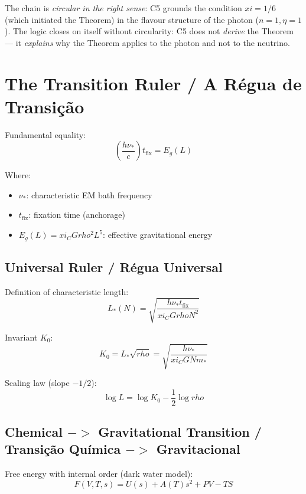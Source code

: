 \documentclass[12pt,a4paper]{article}
\def\to{ -> }%
\def\xi{xi}%
\def\rho{rho}%
\begin{document}
The chain is \emph{circular in the right sense}: C5 grounds the condition $\xi = 1/6$ (which initiated the Theorem) in the flavour structure of the photon ($n=1, \eta=1$). The logic closes on itself without circularity: C5 does not \emph{derive} the Theorem --- it \emph{explains} why the Theorem applies to the photon and not to the neutrino.

\section{The Transition Ruler / A Régua de Transição}

Fundamental equality:
\begin{equation}
\left(\frac{h\nu_*}{c}\right)t_{\text{fix}} = E_g(L)
\end{equation}

Where:
\begin{itemize}
    \item $\nu_*$: characteristic EM bath frequency
    \item $t_{\text{fix}}$: fixation time (anchorage)
    \item $E_g(L) = \xi_C G\rho^2 L^5$: effective gravitational energy
\end{itemize}

\subsection{Universal Ruler / Régua Universal}

Definition of characteristic length:
\begin{equation}
L_*(N) = \sqrt{\frac{h\nu_*t_{\text{fix}}}{\xi_C G\rho N^2}}
\end{equation}

Invariant $K_0$:
\begin{equation}
\boxed{K_0 = L_*\sqrt{\rho} = \sqrt{\frac{h\nu_*}{\xi_C G N m_*}}}
\end{equation}

Scaling law (slope $-1/2$):
\begin{equation}
\log L = \log K_0 - \frac{1}{2}\log\rho
\end{equation}

\subsection{Chemical $\to$ Gravitational Transition / Transição Química $\to$ Gravitacional}

Free energy with internal order (dark water model):
\begin{equation}
F(V,T,s) = U(s) + A(T)s^2 + PV - TS
\end{equation}
\end{document}
